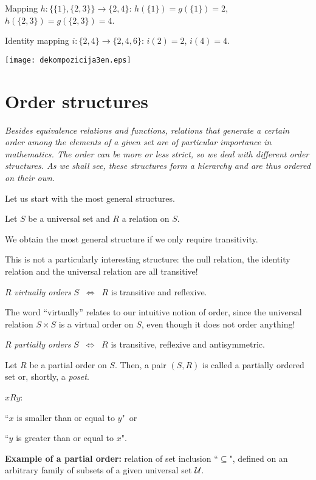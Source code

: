 \documentclass[11pt,paper=b5,footinclude,headinclude]{scrbook} %
\def\cee {{~\Leftrightarrow~}}
\theoremstyle{remark}
\theoremstyle{definition} %
\theoremstyle{theorem} %
\begin{document}
Mapping $h: \{\{1\},\{2,3\}\}\to \{2,4\}$:
$h(\{1\}) = g(\{1\}) = 2$, $h(\{2,3\}) = g(\{2,3\}) = 4$.

Identity mapping $i:\{2,4\}\to\{2,4,6\}$: $i(2) = 2$, $i(4) = 4$.

\begin{center}
\texttt{[image: dekompozicija3en.eps]}
\end{center}

\newpage
\section{Order structures}

{\em Besides equivalence relations and functions, relations that generate a certain \emph{ order} among the elements of a given set
are of particular importance in mathematics. The order can be more or less strict, so we deal with different order structures. As we shall see, these structures form a hierarchy and are thus ordered on their own.}

\bigskip
Let us start with the most general structures.

\bigskip

Let $S$ be a universal set and $R$ a relation on $S$.

We obtain the most general structure if we only require transitivity.

This is not a particularly interesting structure: the null relation, the identity relation and the universal relation are all transitive!

\bigskip
$R$ {\em virtually orders} $S$ $\cee$ $R$ is transitive and reflexive.

The word ``virtually'' relates to our intuitive notion of order, since the universal relation $S\times S$ is a virtual order on $S$, even though it does not order anything!

\medskip
$R$ {\em partially orders} $S$ $\cee$ $R$ is transitive, reflexive and antisymmetric.

\medskip
Let $R$ be a partial order on $S$. Then, a pair $(S,R)$ is called a partially ordered set or, shortly, a {\em poset}.

$xRy$:

``$x$ is smaller than or equal to $y$"~or

``$y$ is greater than or equal to $x$".

\medskip
\textbf{ Example of a partial order:} relation of set inclusion ``$\subseteq$", defined
on an arbitrary family of subsets of a given universal set ${\cal U}$.
\end{document}
